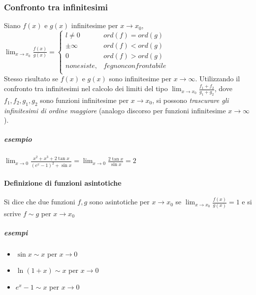 \documentclass{book}
\begin{document}
\subsubsection{Confronto tra infinitesimi}
Siano $f(x)$ e $g(x)$ infinitesime per $x\to x_{0}$,\\
$\lim_{x\to x_0}\frac{f(x)}{g(x)}=
\begin{cases}
l\neq 0&ord(f)=ord(g)\\
\pm \infty&ord(f)<ord(g)\\
0&ord(f)>ord(g)\\
non esiste, & f e g non confrontabile \\ 
\end{cases}
$\\
Stesso risultato se $f(x)$ e $g(x)$ sono infinitesime per $x\to \infty$. Utilizzando il confronto tra infinitesimi nel calcolo dei limiti del tipo $\lim_{x\to x_0}\frac{f_1+f_2}{g_1+g_2}$, dove $f_1,f_2,g_1,g_2$ sono funzioni infinitesime per $x\to x_0$, si possono {\color{blue} \em trascurare gli infinitesimi di ordine maggiore} (analogo discorso per funzioni infinitesime $x\to \infty$).
\subparagraph{esempio}
$\lim_{x\to 0}\frac{x^2+x^3+2\tan{x}}{(e^x-1)^2+\sin{x}}=\lim_{x\to 0}\frac{2\tan x}{\sin x}=2$
\paragraph{Definizione di funzioni asintotiche}
Si dice che due funzioni $f,g$ sono asintotiche per $x\to x_0$ se $\lim_{x\to x_0}\frac{f(x)}{g(x)}=1$ e si scrive $f\sim g$ per $x\to x_0$
\subparagraph{esempi}
\begin{itemize}
	\item $\sin x\sim x$ per $x\to 0$
	\item $\ln(1+x)\sim x$ per $x\to 0$
	\item $e^x-1\sim x$ per $x\to 0$ 
\end{itemize}
\end{document}
